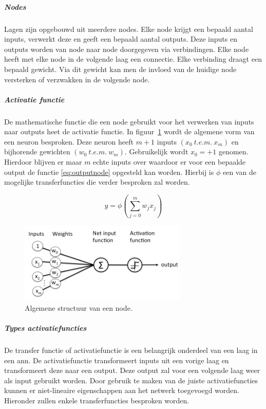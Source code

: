 			\subparagraph{Nodes}
			 Lagen zijn opgebouwd uit meerdere nodes. Elke node krijgt een bepaald aantal inputs, verwerkt deze en geeft een bepaald aantal outputs. Deze inputs en outputs worden van node naar node doorgegeven via verbindingen. Elke node heeft met elke node in de volgende laag een connectie. Elke verbinding draagt een bepaald gewicht. Via dit gewicht kan men de invloed van de huidige node versterken of verzwakken in de volgende node.
	
			\subparagraph{Activatie functie}
			De mathematische functie die een node gebruikt voor het verwerken van inputs naar outputs heet de activatie functie. In figuur~\ref{fig:artificial_neuron} wordt de algemene vorm van een neuron besproken. Deze neuron heeft $m+1$ inputs $\left(  x_0 ~t.e.m.~  x_m\right) $ en bijhorende gewichten $\left(  w_0~  t.e.m. ~ w_m \right) $.
			Gebruikelijk wordt $x_0 = +1$ genomen. Hierdoor blijven er maar $m$ echte inputs over waardoor er voor een bepaalde output de functie \ref{eq:outputnode} opgesteld kan worden. Hierbij is $\phi$ een van de mogelijke transferfuncties die verder besproken zal worden.

			\begin{equation}
				y = \phi \left( \sum_{j=0}^{m}w_{j}x_j\right) 
				\label{eq:outputnode}
			\end{equation}
			
			\begin{figure}
				\centering
				\includegraphics[width=80mm]{afbeeldingen/Artificial_neuron2.PNG}
				\caption[Algemene structuur van een node.]{Algemene structuur van een node\cite{bron:nnnode2}.}
				\label{fig:artificial_neuron}
			\end{figure}
			
			\subparagraph{Types activatiefuncties}
			De transfer functie of activatiefunctie is een belangrijk onderdeel van een laag in een \gls{ann}. De activatiefunctie transformeert inputs uit een vorige laag en transformeert deze naar een output. Deze output zal voor een volgende laag weer als input gebruikt worden. Door gebruik te maken van de juiste activatiefuncties kunnen er niet-lineaire eigenschappen aan het netwerk toegevoegd worden. Hieronder zullen enkele transferfuncties besproken worden.
			

